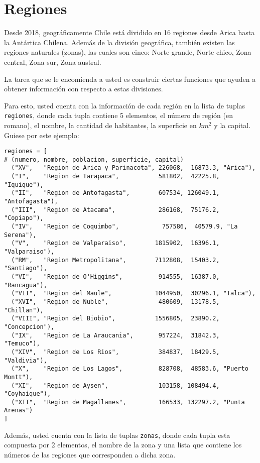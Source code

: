 \section{Regiones}

Desde 2018, geográficamente Chile está dividido en 16 regiones desde Arica hasta la Antártica Chilena. Además de la división geográfica, también existen las regiones naturales (zonas), las cuales son cinco: Norte grande, Norte chico, Zona central, Zona sur, Zona austral.

La tarea que se le encomienda a usted es construir ciertas funciones que ayuden a obtener información con respecto a estas divisiones. 

Para esto, usted cuenta con la información de cada región en la lista de tuplas \texttt{regiones}, donde cada tupla contiene 5 elementos, el número de región (en romano), el nombre, la cantidad de habitantes, la superficie en $km^2$ y la capital. Guiese por este ejemplo:

\begin{lstlisting}[style=consola]
regiones = [
# (numero, nombre, poblacion, superficie, capital)
  ("XV",   "Region de Arica y Parinacota", 226068,  16873.3, "Arica"), 
  ("I",    "Region de Tarapaca",           581802,  42225.8, "Iquique"), 
  ("II",   "Region de Antofagasta",        607534, 126049.1, "Antofagasta"),
  ("III",  "Region de Atacama",            286168,  75176.2, "Copiapo"),
  ("IV",   "Region de Coquimbo",            757586,  40579.9, "La Serena"),
  ("V",    "Region de Valparaiso",        1815902,  16396.1, "Valparaiso"),
  ("RM",   "Region Metropolitana",        7112808,  15403.2, "Santiago"),
  ("VI",   "Region de O'Higgins",          914555,  16387.0, "Rancagua"),
  ("VII",  "Region del Maule",            1044950,  30296.1, "Talca"),
  ("XVI",  "Region de Nuble",              480609,  13178.5, "Chillan"),
  ("VIII", "Region del Biobio",           1556805,  23890.2, "Concepcion"),
  ("IX",   "Region de La Araucania",       957224,  31842.3, "Temuco"),
  ("XIV",  "Region de Los Rios",           384837,  18429.5, "Valdivia"),
  ("X",    "Region de Los Lagos",          828708,  48583.6, "Puerto Montt"),
  ("XI",   "Region de Aysen",              103158, 108494.4, "Coyhaique"),
  ("XII",  "Region de Magallanes",         166533, 132297.2, "Punta Arenas")
]
\end{lstlisting}

Además, usted cuenta con la lista de tuplas \texttt{zonas}, donde cada tupla esta compuesta por 2 elementos, el nombre de la zona y una lista que contiene los números de las regiones que corresponden a dicha zona.

